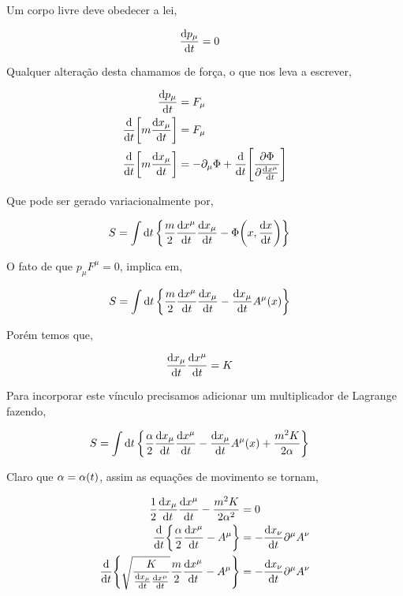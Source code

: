 \documentclass[twoside]{amsart}
\numberwithin{equation}{section}
\begin{document}
Um corpo livre deve obedecer a lei,

\begin{align}
    \dv{p_\mu}{t}&=0
\end{align}

Qualquer alteração desta chamamos de força, o que nos leva a escrever,

\begin{align}
    \dv{p_\mu}{t}&=F_\mu\\
    \dv{}{t}\qty[m\dv{x_\mu}{t}]&=F_\mu\\
    \dv{}{t}\qty[m\dv{x_\mu}{t}]&=-\partial_\mu\Phi+\dv{}{t}\qty[\pdv{\Phi}{\dv{x^\mu}{t}}]    
\end{align}

Que pode ser gerado variacionalmente por,

\begin{align}
    S&=\int\dd{t}\qty{\frac m2\dv{x^\mu}{t}\dv{x_\mu}{t}-\Phi\qty(x, \dv{x}{t})}
\end{align}

O fato de que $p_\mu F^\mu=0$, implica em,

\begin{align}
    S&=\int\dd{t}\qty{\frac m2\dv{x^\mu}{t}\dv{x_\mu}{t}-\dv{x_\mu}{t}A^\mu\qty(x)}
\end{align}

Porém temos que,

\begin{align}
    \dv{x_\mu}{t}\dv{x^\mu}{t}&=K
\end{align}

Para incorporar este vínculo precisamos adicionar um multiplicador de Lagrange fazendo,

\begin{align*}
    S&=\int\dd{t}\qty{\frac\alpha 2\dv{x_\mu}{t}\dv{x^\mu}{t}-\dv{x_\mu}{t}A^\mu\qty(x)+\frac{m^2K}{2\alpha}}
\end{align*}

Claro que $\alpha=\alpha\qty(t)$, assim as equações de movimento se tornam,

\begin{align*}
    \frac12\dv{x_\mu}{t}\dv{x^\mu}{t}-\frac{m^2K}{2\alpha^2}&=0\\
    \dv{}{t}\qty{\frac\alpha 2\dv{x^\mu}{t}-A^\mu}&=-\dv{x_\nu}{t}\partial^\mu A^{\nu}\\
    \dv{}{t}\qty{\sqrt{\frac{K}{\dv{x_\mu}{t}\dv{x^\mu}{t}}}\frac m 2\dv{x^\mu}{t}-A^\mu}&=-\dv{x_\nu}{t}\partial^\mu A^{\nu}\\
\end{align*}
\end{document}
